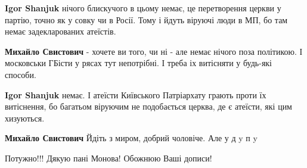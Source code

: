 \begin{itemize}
\begin{itemize}
 
\textbf{Igor Shanjuk} нічого блискучого в цьому немає, це перетворення церкви у партію, точно як у совку чи в Росії. Тому і йдуть віруючі люди в МП, бо там немає задекларованих атеїстів.

 
\textbf{Михайло Свистович} - хочете ви того, чи ні - але немає нічого поза політикою. І московськи ГБісти у рясах тут непотрібні. І треба іх витісняти у будь-які способи.

 
\textbf{Igor Shanjuk} немає. І атеїсти Київського Патріархату грають проти їх витіснення, бо багатьом віруючим не подобається церква, де є атеїсти, які цим хизуються.

 
\textbf{Михайло Свистович} Йдіть з миром, добрий чоловіче.
Але у
д
y
п
y
\end{itemize}

 
Потужно!!! Дякую пані Монова! Обожнюю Ваші дописи!

\begin{itemize}
 

\end{itemize}
\end{itemize}
